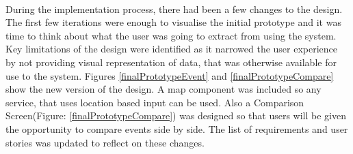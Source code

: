 \documentclass{l4proj}
\begin{document}
\paragraph{}
During the implementation process, there had been a few changes to the design. The first few iterations were enough to visualise the initial prototype and it was time to think about what the user was going to extract from using the system. Key limitations of the design were identified as it narrowed the user experience by not providing visual representation of data, that was otherwise available for use to the system. Figures  \ref{finalPrototypeEvent} and \ref{finalPrototypeCompare} show the new version of the design. A map component was included so any service, that uses location based input can be used. Also a Comparison Screen(Figure: \ref{finalPrototypeCompare}) was designed so that users will be given the opportunity to compare events side by side. The list of requirements and user stories was updated to reflect on these changes.
\end{document}
